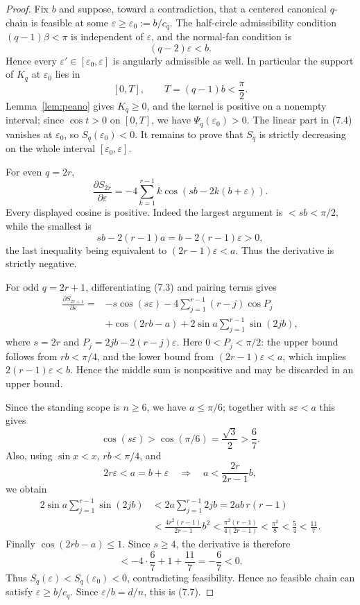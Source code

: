 \documentclass[11pt]{article}
\theoremstyle{remark}
\begin{document}
\begin{proof}
Fix $b$ and suppose, toward a contradiction, that a centered canonical $q$-chain is feasible at some $\varepsilon\ge\varepsilon_0:=b/c_q$.  The half-circle admissibility condition $(q-1)\beta<\pi$ is independent of $\varepsilon$, and the normal-fan condition is
\[
(q-2)\varepsilon<b.
\]
Hence every $\varepsilon'\in[\varepsilon_0,\varepsilon]$ is angularly admissible as well.  In particular the support of $K_q$ at $\varepsilon_0$ lies in
\[
[0,T],\qquad T=(q-1)b<\frac\pi2.
\]
Lemma~\ref{lem:peano} gives $K_q\ge0$, and the kernel is positive on a nonempty interval; since $\cos t>0$ on $[0,T]$, we have $\Psi_q(\varepsilon_0)>0$.  The linear part in (7.4) vanishes at $\varepsilon_0$, so $S_q(\varepsilon_0)<0$.  It remains to prove that $S_q$ is strictly decreasing on the whole interval $[\varepsilon_0,\varepsilon]$.

For even $q=2r$,
\[
\frac{\partial S_{2r}}{\partial\varepsilon}
=-4\sum_{k=1}^{r-1}k\cos(sb-2k(b+\varepsilon)).
\]
Every displayed cosine is positive. Indeed the largest argument is $<sb<\pi/2$, while the smallest is
\[
sb-2(r-1)a=b-2(r-1)\varepsilon>0,
\]
the last inequality being equivalent to $(2r-1)\varepsilon<a$. Thus the derivative is strictly negative.

For odd $q=2r+1$, differentiating (7.3) and pairing terms gives
\[
\begin{aligned}
\frac{\partial S_{2r+1}}{\partial\varepsilon}
={}&-s\cos(s\varepsilon)-4\sum_{j=1}^{r-1}(r-j)\cos P_j\\
&+\cos(2rb-a)+2\sin a\sum_{j=1}^{r-1}\sin(2jb),
\end{aligned}
\]
where $s=2r$ and $P_j=2jb-2(r-j)\varepsilon$. Here $0<P_j<\pi/2$: the upper bound follows from $rb<\pi/4$, and the lower bound from $(2r-1)\varepsilon<a$, which implies $2(r-1)\varepsilon<b$. Hence the middle sum is nonpositive and may be discarded in an upper bound.

Since the standing scope is $n\ge6$, we have $a\le\pi/6$; together with $s\varepsilon<a$ this gives
\[
\cos(s\varepsilon)>\cos(\pi/6)=\frac{\sqrt3}{2}>\frac67.
\]
Also, using $\sin x<x$, $rb<\pi/4$, and
\[
2r\varepsilon<a=b+\varepsilon
\quad\Longrightarrow\quad
 a<\frac{2r}{2r-1}b,
\]
we obtain
\[
\begin{aligned}
2\sin a\sum_{j=1}^{r-1}\sin(2jb)
&<2a\sum_{j=1}^{r-1}2jb
=2ab\,r(r-1)\\
&<\frac{4r^2(r-1)}{2r-1}b^2
<\frac{\pi^2(r-1)}{4(2r-1)}
<\frac{\pi^2}{8}<\frac54<\frac{11}{7}.
\end{aligned}
\]
Finally $\cos(2rb-a)\le1$. Since $s\ge4$, the derivative is therefore
\[
< -4\cdot\frac67+1+\frac{11}{7}=-\frac67<0.
\]
Thus $S_q(\varepsilon)<S_q(\varepsilon_0)<0$, contradicting feasibility.  Hence no feasible chain can satisfy $\varepsilon\ge b/c_q$. Since $\varepsilon/b=d/n$, this is (7.7).
\end{proof}
\end{document}
